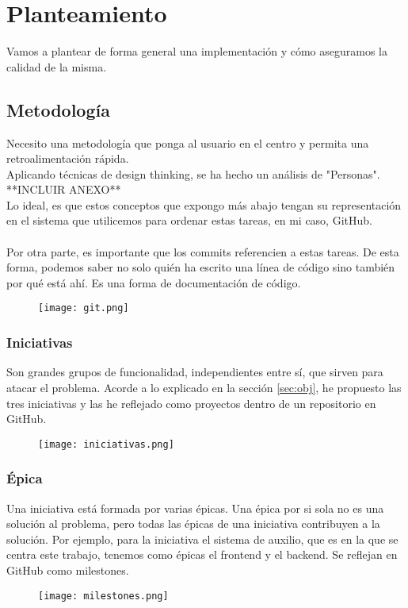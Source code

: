 \chapter{Planteamiento}

Vamos a plantear de forma general una implementación y cómo aseguramos la calidad de la misma.

\section{Metodología}

Necesito una metodología que ponga al usuario en el centro y permita una retroalimentación rápida.\\
Aplicando técnicas de design thinking, se ha hecho un análisis de "Personas". **INCLUIR ANEXO**
\\
Lo ideal, es que estos conceptos que expongo más abajo tengan su representación en el sistema que utilicemos
para ordenar estas tareas, en mi caso, GitHub. \\ \\
Por otra parte, es importante que los commits referencien a estas tareas. De esta forma, podemos
saber no solo quién ha escrito una línea de código sino también por qué está ahí. Es una forma de documentación de código.
\begin{figure}[H]
\centering	
\texttt{[image: git.png]}
\end{figure}
\subsection{Iniciativas}
Son grandes grupos de funcionalidad, independientes entre sí, que sirven para atacar el problema.
Acorde a lo explicado en la sección \ref{sec:obj}, he propuesto las tres iniciativas y las he 
reflejado como proyectos dentro de un repositorio en GitHub.
\begin{figure}[H]
\centering	
\texttt{[image: iniciativas.png]}
\end{figure}

\subsection{Épica}
Una iniciativa está formada por varias épicas. Una épica por si sola no es una solución al problema, pero todas las épicas de una iniciativa contribuyen a la solución.
Por ejemplo, para la iniciativa el sistema de auxilio, que es en la que se centra este trabajo, tenemos 
como épicas el frontend y el backend. Se reflejan en GitHub como milestones.
\begin{figure}[H]
	\centering
\texttt{[image: milestones.png]}
\end{figure}


